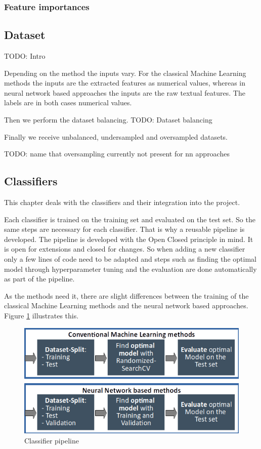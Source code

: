 \subsubsection*{Feature importances}


\subsection{Dataset}
\label{ch:approachD}

TODO: Intro

Depending on the method the inputs vary. For the classical Machine Learning methods the inputs are the extracted features as numerical values, whereas in neural network based approaches the inputs are the raw textual features. The labels are in both cases numerical values.

Then we perform the dataset balancing.
TODO: Dataset balancing


Finally we receive unbalanced, undersampled and oversampled datasets.

TODO: name that oversampling currently not present for nn approaches


\subsection{Classifiers}
\label{ch:approachE}

This chapter deals with the classifiers and their integration into the project.

Each classifier is trained on the training set and evaluated on the test set. So the same steps are necessary for each classifier. That is why a reusable pipeline is developed. The pipeline is developed with the Open Closed principle in mind. It is open for extensions and closed for changes. So when adding a new classifier only a few lines of code need to be adapted and steps such as finding the optimal model through hyperparameter tuning and the evaluation are done automatically as part of the pipeline.

As the methods need it, there are slight differences between the training of the classical Machine Learning methods and the neural network based approaches. Figure \ref{fig:classifier_pipeline} illustrates this.

\begin{figure}[ht]
	\centering
	\includegraphics[width=0.7\linewidth]{figures/classifier_pipeline.png}
	\caption{Classifier pipeline}
	\label{fig:classifier_pipeline}
\end{figure}

